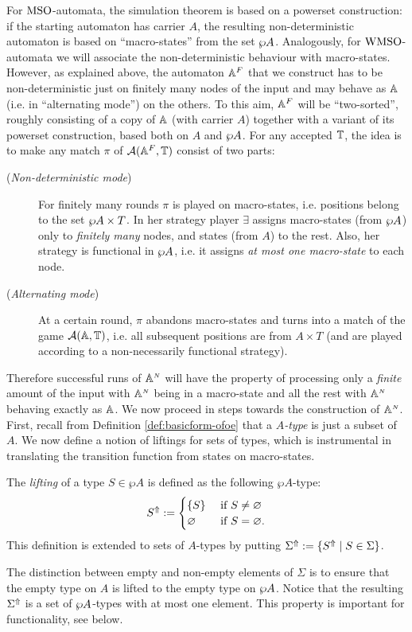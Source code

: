For $\mathrm{MSO}$-automata, the simulation theorem is based on a powerset construction:
if the starting automaton has carrier $A$, the resulting non-deterministic
automaton is based on ``macro-states'' from the set $\wp A$.
Analogously, for $\mathrm{WMSO}$-automata we will associate the non-deterministic
behaviour with macro-states.
However, as explained above, the automaton $\mathbb{A}^{F}$ that we construct has to
be non-deterministic just on finitely many nodes of the input and may behave as
$\mathbb{A}$ (i.e. in ``alternating mode'') on the others.
To this aim, $\mathbb{A}^{F}$ will be ``two-sorted'', roughly consisting of a copy of
$\mathbb{A}$ (with carrier $A$) together with a variant of its powerset construction,
based both on $A$ and $\wp A$.
For any accepted $\mathbb{T}$, the idea is to make any match $\pi$ of
$\mathcal{A}(\mathbb{A}^{F},\mathbb{T})$ consist of two parts:
\begin{description}
\item[(\textit{Non-deterministic mode})] For finitely many rounds $\pi$ is
  played on macro-states, i.e. positions belong to the set $\wp A \times T$.
  In her strategy player $\exists$ assigns macro-states (from $\wp A$) only to
  \emph{finitely many} nodes, and states (from $A$) to the rest.
  Also, her strategy is functional in $\wp A$, i.e. it assigns \emph{at most one
  macro-state} to each node.
\item[(\textit{Alternating mode})] At a certain round, $\pi$ abandons
  macro-states and turns into a match of the game $\mathcal{A}(\mathbb{A},\mathbb{T})$, i.e. all
  subsequent positions are from $A \times T$ (and are played according to a
  non-necessarily functional strategy).
\end{description}
Therefore successful runs of $\mathbb{A}^{{\scriptscriptstyle N}}$ will have the property of processing 
only a \emph{finite} amount of the input with $\mathbb{A}^{{\scriptscriptstyle N}}$ being in a 
macro-state and all the rest with $\mathbb{A}^{{\scriptscriptstyle N}}$ behaving exactly as $\mathbb{A}$.
We now proceed in steps towards the construction of $\mathbb{A}^{{\scriptscriptstyle N}}$. 
First, recall from Definition \ref{def:basicform-ofoe} that a \emph{$A$-type} is
just a subset of $A$. 
We now define a notion of liftings for sets of types, which is instrumental in
translating the transition function from states on macro-states.

\begin{definition}
The \emph{lifting} of a type $S \in \wp A$ is defined as the following
$\wp A$-type:
\[
\lift{S} \isdef 
\begin{cases} \{ S \} & \text{ if } S \neq \nada \\
\nada & \text{ if } S = \nada.
\end{cases}
\]
This definition is extended to sets of $A$-types by putting $\Sigma^{\Uparrow} 
\mathrel{:=} \{ S^{\Uparrow} \mid S \in \Sigma \}$.
\end{definition}
The distinction between empty and non-empty elements of $\Sigma$ is to ensure 
that the empty type on $A$ is lifted to the empty type on $\wp A$. 
Notice that the resulting $\Sigma^{\Uparrow}$ is a set of $\wp A$-types with at most
one element. This property is important for functionality, see below.

